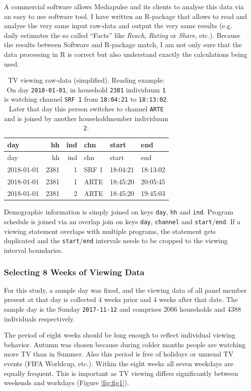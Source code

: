 \documentclass[]{article}
\begin{document}
A commercial software allows Mediapulse and its clients to analyse this
data via an easy to use software tool. I have written an R-package that
allows to read and analyse the very same input raw-data and output the
very same results (e.g.~ daily estimates the so called ``Facts'' like
\emph{Reach}, \emph{Rating} or \emph{Share}, etc.). Because the results
between Software and R-package match, I am not only sure that the data
processing in R is correct but also understand exactly the calculations
being used.

\begin{longtable}[]{@{}lrrlll@{}}
\caption{\label{tab:tab1}TV viewing raw-data (simplified). Reading
example: On day \texttt{2018-01-01}, in household \texttt{2381}
individuum \texttt{1} is watching channel \texttt{SRF\ 1} from
\texttt{18:04:21} to \texttt{18:13:02}. Later that day this person
switches to channel \texttt{ARTE} and is joined by another
householdmember individuum \texttt{2}.}\tabularnewline
\toprule
day & hh & ind & chn & start & end\tabularnewline
\midrule
\endfirsthead
\toprule
day & hh & ind & chn & start & end\tabularnewline
\midrule
\endhead
2018-01-01 & 2381 & 1 & SRF 1 & 18:04:21 & 18:13:02\tabularnewline
2018-01-01 & 2381 & 1 & ARTE & 18:45:20 & 20:05:45\tabularnewline
2018-01-01 & 2381 & 2 & ARTE & 18:45:20 & 19:45:03\tabularnewline
\bottomrule
\end{longtable}

Demographic information is simply joined on keys \texttt{day},
\texttt{hh} and \texttt{ind}. Program schedule is joined via an overlap
join on keys \texttt{day}, \texttt{channel} and
\texttt{start}/\texttt{end}. If a viewing statement overlaps with
multiple programs, the statement gets duplicated and the
\texttt{start}/\texttt{end} intervals needs to be cropped to the viewing
interval boundaries.

\hypertarget{selecting-8-weeks-of-viewing-data}{%
\subsubsection{Selecting 8 Weeks of Viewing
Data}\label{selecting-8-weeks-of-viewing-data}}

For this study, a sample day was fixed, and the viewing data of all
panel member present at that day is collected 4 weeks prior and 4 weeks
after that date. The sample day is the Sunday \texttt{2017-11-12} and
comprises 2006 households and 4388 individuals respectively.

The period of eight weeks should be long enough to reflect individual
viewing behavior. Autumn was chosen because during colder months people
are watching more TV than in Summer. Also this period is free of
holidays or unusual TV events (FIFA Worldcup, etc.). Within the eight
weeks all seven weekdays are equally frequent. This is important as TV
viewing differs significantly between weekends and workdays (Figure
\ref{fig:fig1}).
\end{document}
